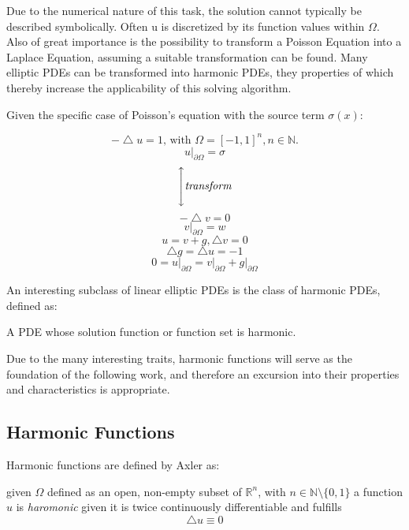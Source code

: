 Due to the numerical nature of this task, the solution cannot typically be described symbolically.
Often u is discretized by its function values within $\Omega$.
Also of great importance is the possibility to transform a Poisson Equation into
a Laplace Equation, assuming a suitable transformation can be found.   Many elliptic \glspl{PDE} can be transformed into harmonic \glspl{PDE},
they properties of which thereby increase the applicability of this solving algorithm\cite{Bornemann}.
\newpage
\begin{example}
  Given the specific case of Poisson's equation with the source term $\sigma(x)$:
  \begin{multicols}{2}
    \begin{equation}
      -\bigtriangleup u = 1\text{, with }\Omega = [-1,1]^{n}, n \in \mathbb{N}.
    \end{equation}
      $$u\big\rvert_{\partial \Omega} = \sigma $$
    \begin{equation}
      \Bigg\updownarrow \textit{transform}
    \end{equation}
    \begin{equation}
      -\bigtriangleup v = 0
    \end{equation}
    $$v\big\rvert_{\partial \Omega} = w$$
    \break
    \begin{equation}
    u = v + g, \bigtriangleup v = 0
    \end{equation}
    \begin{equation}
      \bigtriangleup g = \bigtriangleup u = -1
    \end{equation}
        $$0 = u\big\rvert_{\partial \Omega} = v\big\rvert_{\partial \Omega} + g\big\rvert_{\partial \Omega}$$\break\break
  \end{multicols}
\cite{Bornemann}
\end{example}
An interesting subclass of linear elliptic \Glspl{PDE} is the class of harmonic \Glspl{PDE}, defined as:
\begin{definition}
  A \Gls{PDE} whose solution function or function set is harmonic.
\end{definition}

Due to the many interesting traits, harmonic functions will serve as the foundation of the
 following work, and therefore an excursion into their properties and characteristics
is appropriate.

\subsection{Harmonic Functions}\label{sssec:harmonics}
Harmonic functions are defined by Axler as:
\begin{definition} given $\Omega$ defined as an open, non-empty subset of
  $\mathbb{R}^{n}$, with $n \in \mathbb{N}\setminus \{0,1\}$
  a function $u$ is \textit{haromonic} given it is twice continuously differentiable
  and fulfills $$ \bigtriangleup u \equiv 0$$
\end{definition}

